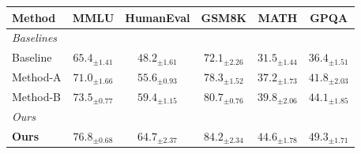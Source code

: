 \documentclass{article}
\begin{document}
\centering
\begin{tabular}{lccccc}
\toprule
\textbf{Method} & \textbf{MMLU} & \textbf{HumanEval} & \textbf{GSM8K} & \textbf{MATH} & \textbf{GPQA} \\
\midrule
\multicolumn{6}{l}{\textit{Baselines}} \\
Baseline & $65.4_{\pm 1.41}$ & $48.2_{\pm 1.61}$ & $72.1_{\pm 2.26}$ & $31.5_{\pm 1.44}$ & $36.4_{\pm 1.51}$ \\
Method-A & $71.0_{\pm 1.66}$ & $55.6_{\pm 0.93}$ & $78.3_{\pm 1.52}$ & $37.2_{\pm 1.73}$ & $41.8_{\pm 2.03}$ \\
Method-B & $73.5_{\pm 0.77}$ & $59.4_{\pm 1.15}$ & $80.7_{\pm 0.76}$ & $39.8_{\pm 2.06}$ & $44.1_{\pm 1.85}$ \\
\midrule
\multicolumn{6}{l}{\textit{Ours}} \\
\textbf{Ours} & \textbf{$76.8_{\pm 0.68}$} & \textbf{$64.7_{\pm 2.37}$} & \textbf{$84.2_{\pm 2.34}$} & \textbf{$44.6_{\pm 1.78}$} & \textbf{$49.3_{\pm 1.71}$} \\
\bottomrule
\end{tabular}
\end{document}
